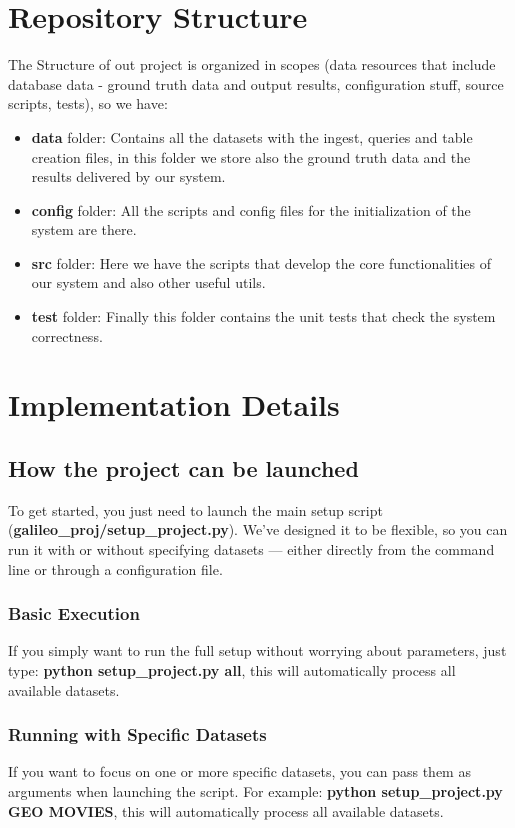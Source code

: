 \documentclass[12pt,a4paper]{article}
\begin{document}
\section{Repository Structure}
The Structure of out project is organized in scopes (data resources that include database data - ground truth data and output results, configuration stuff,  source scripts, tests), so we have:\\
\begin{itemize}
    \item \textbf{data} folder: Contains all the datasets with the ingest, queries and table creation files, in this folder we store also the ground truth data and the results delivered by our system.
    \item \textbf{config} folder: All the scripts and config files for the initialization of the system are there.
    \item \textbf{src} folder: Here we have the scripts that develop the core functionalities of our system and also other useful utils. 
    \item \textbf{test} folder: Finally this folder contains the unit tests that check the system correctness.
\end{itemize}

\section{Implementation Details}

\subsection{How the project can be launched}
To get started, you just need to launch the main setup script (\textbf{galileo\_proj/setup\_project.py}). We’ve designed it to be flexible, so you can run it with or without specifying datasets — either directly from the command line or through a configuration file.
\subsubsection{Basic Execution}
If you simply want to run the full setup without worrying about parameters, just type: \textbf{python setup\_project.py all}, this will automatically process all available datasets.
\subsubsection{Running with Specific Datasets}
If you want to focus on one or more specific datasets, you can pass them as arguments when launching the script. For example: \textbf{python setup\_project.py GEO MOVIES}, this will automatically process all available datasets.
\end{document}
